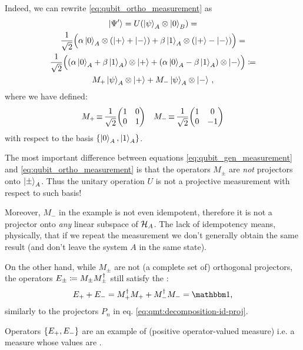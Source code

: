 Indeed, we can rewrite \eqref{eq:qubit_ortho_measurement} as
\begin{multline}\label{eq:qubit_gen_measurement}
  \ket{\Psi'}                                               =
  U( \ket{\psi}_A \otimes \ket{0}_B )                           =         \\
  \frac{1}{\sqrt{2}} \qty\Big(
    \alpha\ket{0}_A \otimes \qty(\ket{+}+\ket{-}) +
    \beta \ket{1}_A \otimes \qty(\ket{+}-\ket{-})
  )                                                         =         \\
  \frac{1}{\sqrt{2}} \qty\Big(
    \qty(\alpha\ket{0}_A + \beta\ket{1}_A) \otimes \ket{+} +
    \qty(\alpha\ket{0}_A - \beta\ket{1}_A) \otimes \ket{-}
  )                                               \coloneqq            \\
  M_+\ket{\psi}_A \otimes \ket{+} + M_-\ket{\psi}_A \otimes \ket{-}
  \,\text{,}
\end{multline}
where we have defined:
\begin{align}\label{eq:qmt:Mpm}
  &
  M_+ \repr \frac{1}{\sqrt{2}}\mqty(\imat{2})
  &
  M_- \repr \frac{1}{\sqrt{2}}\mqty(1& 0\\0& -1)
\end{align}
with respect to the basis $\left\{\ket{0}_A, \ket{1}_A\right\}$.

The most important difference between equations \eqref{eq:qubit_gen_measurement}
and \eqref{eq:qubit_ortho_measurement} is that
the o\-per\-a\-tors $M_{\pm}$ are \emph{not} projectors onto $\ket{\pm}_A$.
Thus the unitary operation $U$ is not a projective measurement
with respect to such basis!

Moreover, $M_-$ in the example is not even idempotent,
therefore it is not a projector onto \emph{any} linear subspace of $\mathcal{H}_A$.
The lack of idempotency means, physically,
that if we repeat the measurement we don't generally
obtain the same result (and don't leave the system $A$ in the same state).

On the other hand,
while $M_{\pm}$ are not (a complete set of) orthogonal projectors,
the operators $E_{\pm} \coloneqq M_{\pm}M_{\pm}^{\dagger}$
still satisfy the
:
\begin{equation}\label{eq:qmt:qubit:povm}
  E_{+} + E_{-} = M_{+}^{\dagger}M_{+} + M_{-}^{\dagger}M_{-} = \idop \text{,}
\end{equation}
similarly to the projectors $P_n$ in eq. \eqref{eq:qmt:decomposition-id-proj}.

Operators $\left\{E_{+}, E_{-}\right\}$ are an example of 
(positive operator-valued measure) i.e. a measure whose
values are .

